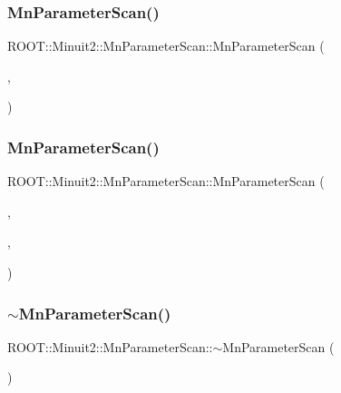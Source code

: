 \subsubsection{\texorpdfstring{MnParameterScan()}{MnParameterScan()}\hspace{0.1cm}{\footnotesize\ttfamily [3/4]}}
{\footnotesize\ttfamily R\+O\+O\+T\+::\+Minuit2\+::\+Mn\+Parameter\+Scan\+::\+Mn\+Parameter\+Scan (\begin{DoxyParamCaption}\item[{const \mbox{\hyperlink{classROOT_1_1Minuit2_1_1FCNBase}{F\+C\+N\+Base}} \&}]{,  }\item[{const \mbox{\hyperlink{classROOT_1_1Minuit2_1_1MnUserParameters}{Mn\+User\+Parameters}} \&}]{ }\end{DoxyParamCaption})}

\mbox{\label{classROOT_1_1Minuit2_1_1MnParameterScan_a741d7ce09e8fb56ab0f1345e8c8520c8}} 
\subsubsection{\texorpdfstring{MnParameterScan()}{MnParameterScan()}\hspace{0.1cm}{\footnotesize\ttfamily [4/4]}}
{\footnotesize\ttfamily R\+O\+O\+T\+::\+Minuit2\+::\+Mn\+Parameter\+Scan\+::\+Mn\+Parameter\+Scan (\begin{DoxyParamCaption}\item[{const \mbox{\hyperlink{classROOT_1_1Minuit2_1_1FCNBase}{F\+C\+N\+Base}} \&}]{,  }\item[{const \mbox{\hyperlink{classROOT_1_1Minuit2_1_1MnUserParameters}{Mn\+User\+Parameters}} \&}]{,  }\item[{double}]{ }\end{DoxyParamCaption})}

\mbox{\label{classROOT_1_1Minuit2_1_1MnParameterScan_af9a8ee2b797033783fe832ebe727ddc2}} 
\subsubsection{\texorpdfstring{$\sim$MnParameterScan()}{~MnParameterScan()}\hspace{0.1cm}{\footnotesize\ttfamily [2/2]}}
{\footnotesize\ttfamily R\+O\+O\+T\+::\+Minuit2\+::\+Mn\+Parameter\+Scan\+::$\sim$\+Mn\+Parameter\+Scan (\begin{DoxyParamCaption}{ }\end{DoxyParamCaption})\hspace{0.3cm}{\ttfamily [inline]}}



